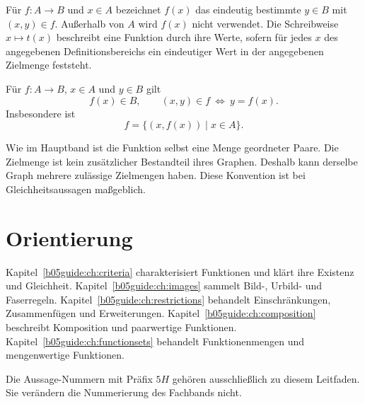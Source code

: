 \begin{definition}
Für $f\colon A\to B$ und $x\in A$ bezeichnet $f(x)$ das
eindeutig bestimmte $y\in B$ mit $(x,y)\in f$.
Außerhalb von $A$ wird $f(x)$ nicht verwendet.
Die Schreibweise $x\mapsto t(x)$ beschreibt eine Funktion durch
ihre Werte, sofern für jedes $x$ des angegebenen Definitionsbereichs
ein eindeutiger Wert in der angegebenen Zielmenge feststeht.
\end{definition}

\begin{theorem}
\label{b05guide:thm:graph}
Für $f\colon A\to B$, $x\in A$ und $y\in B$ gilt
\[
 f(x)\in B,\qquad (x,y)\in f\ \Longleftrightarrow\ y=f(x).
\]
Insbesondere ist
\[
 f=\{(x,f(x))\mid x\in A\}.
\]
\end{theorem}

Wie im Hauptband ist die Funktion selbst eine Menge geordneter
Paare. Die Zielmenge ist kein zusätzlicher Bestandteil ihres
Graphen. Deshalb kann derselbe Graph mehrere zulässige Zielmengen
haben. Diese Konvention ist bei Gleichheitsaussagen maßgeblich.

\section{Orientierung}

Kapitel~\ref{b05guide:ch:criteria} charakterisiert Funktionen
und klärt ihre Existenz und Gleichheit.
Kapitel~\ref{b05guide:ch:images} sammelt Bild-, Urbild- und Faserregeln.
Kapitel~\ref{b05guide:ch:restrictions} behandelt Einschränkungen,
Zusammenfügen und Erweiterungen.
Kapitel~\ref{b05guide:ch:composition} beschreibt Komposition
und paarwertige Funktionen.
Kapitel~\ref{b05guide:ch:functionsets} behandelt Funktionenmengen
und mengenwertige Funktionen.

Die Aussage-Nummern mit Präfix $5H$ gehören ausschließlich zu
diesem Leitfaden. Sie verändern die Nummerierung des Fachbands nicht.
